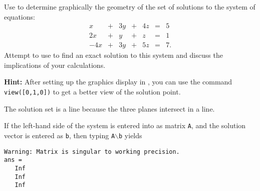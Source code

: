 \documentclass{ximera}
\begin{document}
\begin{exercise} \label{c2.2.4}
Use \Matlab to determine graphically the geometry of the set of
solutions to the system of equations:
\[
\begin{array}{rcrcrcr}
  x & + & 3y & + & 4z  & = & 5\\
 2x & + &  y & + &  z  & = & 1\\
-4x & + & 3y & + & 5z  & = & 7.
\end{array}
\]
Attempt to use \Matlab to find an exact solution to this system
and discuss the implications of your calculations.

{\bf Hint:} After setting up the graphics display in \Matlabp,
you can use the command {\tt view([0,1,0])}  to get
a better view of the solution point.

\begin{solution}

\ans The solution set is a line because the three planes intersect in a line.

\soln If the left-hand side of the system is entered into \Matlab as
matrix {\tt A}, and the solution vector is entered as {\tt b}, then
typing {\tt A}$\backslash${\tt b} yields
\begin{verbatim}
Warning: Matrix is singular to working precision.
ans =
   Inf
   Inf
   Inf
\end{verbatim}

\end{solution}
\end{exercise}
\end{document}
